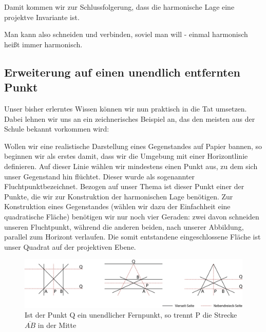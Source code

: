 \documentclass[12pt,a4paper]{article}
\begin{document}
Damit kommen wir zur Schlussfolgerung, dass die harmonische Lage eine projektve Invariante ist.

\glqq Man kann also schneiden und verbinden, soviel man will - einmal harmonisch heißt immer harmonisch.~\citep[s.~][S.~49]{projektiveGeometrie}\grqq

\subsection{Erweiterung auf einen unendlich entfernten Punkt}

Unser bisher erlerntes Wissen können wir nun praktisch in die Tat umsetzen. Dabei lehnen wir uns an ein zeichnerisches Beispiel an, das den meisten aus der Schule bekannt vorkommen wird:

Wollen wir eine realistische Darstellung eines Gegenstandes auf Papier bannen, so beginnen wir als erstes damit, dass wir die Umgebung mit einer Horizontlinie definieren. Auf dieser Linie wählen wir mindestens einen Punkt aus, zu dem sich unser Gegenstand hin \glqq flüchtet\grqq . Dieser wurde als sogenannter \glqq Fluchtpunkt\grqq bezeichnet. Bezogen auf unser Thema ist dieser Punkt einer der Punkte, die wir zur Konstruktion der harmonischen Lage benötigen. Zur Konstruktion eines Gegenstandes (wählen wir dazu der Einfachheit eine quadratische Fläche) benötigen wir nur noch vier Geraden: zwei davon schneiden unseren Fluchtpunkt, während die anderen beiden, nach unserer Abbildung, parallel zum Horizont verlaufen. Die somit entstandene eingeschlossene Fläche ist unser Quadrat auf der projektiven Ebene.

\begin{figure}[htbp]
\centering
\includegraphics[width=\textwidth]{Bilder/inftyPoint.png}
\caption{Ist der Punkt Q ein unendlicher Fernpunkt, so trennt P die Strecke $\overline{A B}$ in der Mitte}
\label{fig:inftyPoint}
\end{figure}
\end{document}
